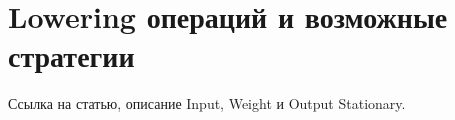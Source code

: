 \section{Lowering операций и возможные стратегии}
\label{sec:Chapter7} 

Ссылка на статью, описание Input, Weight и Output Stationary.

\newpage
